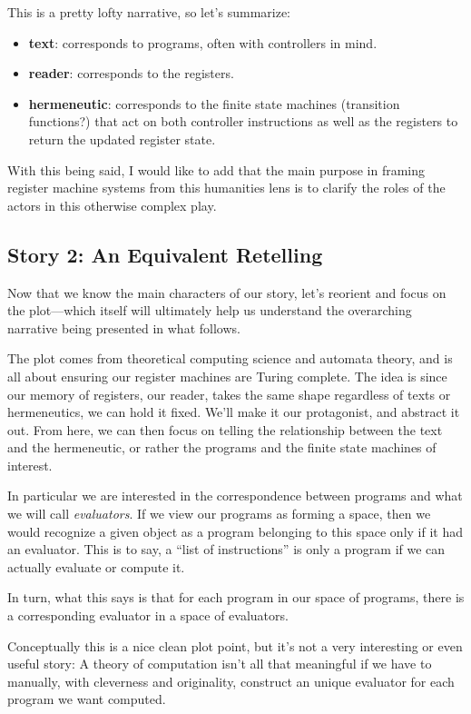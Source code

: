 \documentclass[twoside]{article}
\newcommand{\strong}[1]{{\bfseries #1}}
\begin{document}
This is a pretty lofty narrative, so let's summarize:

\begin{itemize}
\item \strong{text}: corresponds to programs, often with controllers in mind.
\item \strong{reader}: corresponds to the registers.
\item \strong{hermeneutic}: corresponds to the finite state machines (transition functions?) that act on both
	controller instructions as well as the registers to return the updated register state.
\end{itemize}

With this being said, I would like to add that the main purpose in framing register machine systems from this
humanities lens is to clarify the roles of the actors in this otherwise complex play.

\subsection*{Story 2: An Equivalent Retelling}

Now that we know the main characters of our story, let's reorient and focus on the plot---which itself will ultimately
help us understand the overarching narrative being presented in what follows.

The plot comes from theoretical computing science and automata theory, and is all about ensuring our register machines
are Turing complete. The idea is since our memory of registers, our reader, takes the same shape regardless of texts
or hermeneutics, we can hold it fixed. We'll make it our protagonist, and abstract it out. From here, we can then
focus on telling the relationship between the text and the hermeneutic, or rather the programs and the finite state
machines of interest.

In particular we are interested in the correspondence between programs and what we will call \emph{evaluators}.
If we view our programs as forming a space, then we would recognize a given object as a program belonging to this
space only if it had an evaluator. This is to say, a ``list of instructions'' is only a program if we can actually
evaluate or compute it.

In turn, what this says is that for each program in our space of programs, there is a corresponding evaluator in
a space of evaluators.

Conceptually this is a nice clean plot point, but it's not a very interesting or even useful story: A theory of
computation isn't all that meaningful if we have to manually, with cleverness and originality, construct an
unique evaluator for each program we want computed.
\end{document}

